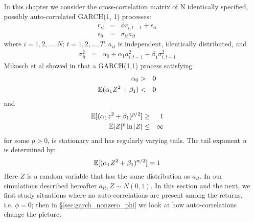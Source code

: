 \documentclass{report}
\begin{document}

In this chapter we consider the cross-correlation matrix of N
identically specified, possibly auto-correlated GARCH(1, 1)
processes:
\begin{eqnarray}
  r_{it} &=& \phi r_{i, t-1} + \epsilon_{it} \nonumber \\
  \epsilon_{it} &=& \sigma_{it} a_{it} \label{eq:garch_spec}
\end{eqnarray}
where $i=1,2,...,N$; $t=1,2,...,T$; $a_{it}$ is independent,
identically distributed, and
\begin{eqnarray*}
  \sigma_{it}^2 &=& \alpha_0 + \alpha_1 a_{i, t-1}^2 + \beta_1
  \sigma_{i,t-1}^2
\end{eqnarray*}
Mikosch et al showed in \cite{mikosch2000} that a GARCH(1,1) process
satisfying
\begin{eqnarray*}
  \alpha_0 &>& 0 \\
  \mathbb{E}(\alpha_1 Z^2 + \beta_1) &<& 0 \\
\end{eqnarray*}
and
\begin{eqnarray*}
  \mathbb{E}[(\alpha_1 z^2 + \beta_1)^{p/2}] &\geq& 1 \\
  \mathbb{E}|Z|^p \ln|Z| &\leq& \infty
\end{eqnarray*}
for some $p > 0$, is stationary and has regularly varying tails. The
tail exponent $\alpha$ is determined by:
\begin{equation}\label{eq:garch_alpha}
  \mathbb{E}[(\alpha_1 Z^2 + \beta_1)^{\alpha/2}] = 1
\end{equation}
Here $Z$ is a random variable that has the same distribution as
$a_{it}$. In our simulations described hereafter $a_{it}, Z \sim N(0,
1)$. In this section and the next, we first study situations where no
auto-correlations are present among the returns, i.e. $\phi = 0$; then
in \S\ref{sec:garch_nonzero_phi} we look at how auto-correlations
change the picture.
\end{document}
